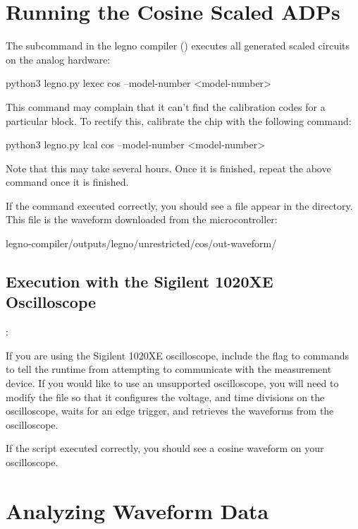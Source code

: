 \section{Running the Cosine Scaled ADPs}

The  subcommand in the legno compiler () executes
all generated scaled circuits on the analog hardware:

\begin{snippet}
python3 legno.py lexec cos --model-number <model-number>
\end{snippet}

This command may complain that it can't find the calibration codes for a
particular block. To rectify this, calibrate the chip with the following
command:


\begin{snippet}
  python3 legno.py lcal cos --model-number <model-number>
\end{snippet}

Note that this may take several hours. Once it is finished, repeat the above
 command once it is finished.

If the  command executed correctly, you should see a  file appear in
the  directory. This file is the waveform downloaded from the
microcontroller:

\begin{snippet}
legno-compiler/outputs/legno/unrestricted/cos/out-waveform/
\end{snippet}

\subsection{Execution with the Sigilent 1020XE Oscilloscope}:

If you are using the Sigilent 1020XE oscilloscope, include the
 flag to  commands to tell the runtime
from attempting to communicate with the measurement device. If you would like to
use an unsupported oscilloscope, you will need to modify the 
file so that it configures the voltage, and time divisions on the oscilloscope, waits for
an edge trigger, and retrieves the waveforms from the oscilloscope.

If the script executed correctly, you should see a cosine waveform on your
oscilloscope.


\section{Analyzing Waveform Data}

